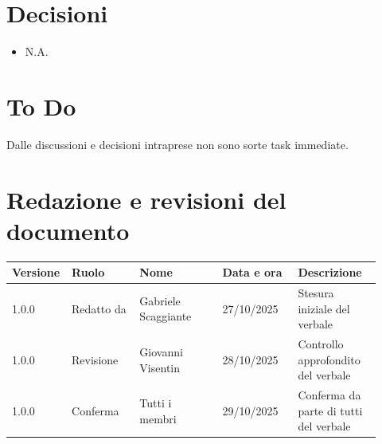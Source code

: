 \documentclass[a4paper,12pt]{article}
\begin{document}
\section{Decisioni}
\begin{itemize}
    \item N.A.
\end{itemize}

\section{To Do}
Dalle discussioni e decisioni intraprese non sono sorte task immediate.

\clearpage
\section{Redazione e revisioni del documento}

\begin{center}
\small
\renewcommand{\arraystretch}{1.2} 
\begin{tabular}{|p{0.1\linewidth}|p{0.18\linewidth}|p{0.22\linewidth}|p{0.20\linewidth}|p{0.22\linewidth}|}
\hline
\rowcolor{gray!60} 
\textbf{Versione} & \textbf{Ruolo} & \textbf{Nome} & \textbf{Data e ora} & \textbf{Descrizione} \\
\hline
\rowcolor{white}
1.0.0 & Redatto da & Gabriele Scaggiante & 27/10/2025 & Stesura iniziale del verbale \\
\hline
\rowcolor{gray!20}
1.0.0 & Revisione & Giovanni Visentin & 28/10/2025 & Controllo approfondito del verbale \\
\hline
\rowcolor{white}
1.0.0 & Conferma & Tutti i membri & 29/10/2025 & Conferma da parte di tutti del verbale \\
\hline

\end{tabular}
\end{center}


\end{document}
